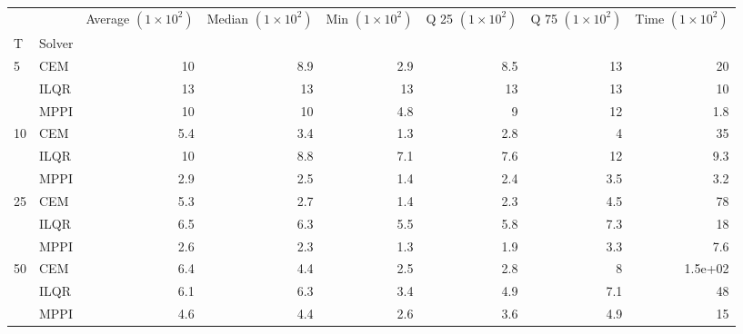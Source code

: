\documentclass[]{standalone}
\begin{document}
\begin{tabular}{llrrrrrr}
\toprule
   &      &  Average $(1 \times 10^2) $ &  Median $(1 \times 10^2) $ &  Min $(1 \times 10^2) $ &  Q 25 $(1 \times 10^2) $ &  Q 75 $(1 \times 10^2) $ &  Time $(1 \times 10^2) $ \\
T & Solver &                             &                            &                         &                          &                          &                          \\
\midrule
5  & CEM &                          10 &                        8.9 &                     2.9 &                      8.5 &                       13 &                       20 \\
   & ILQR &                          13 &                         13 &                      13 &                       13 &                       13 &                       10 \\
   & MPPI &                          10 &                         10 &                     4.8 &                        9 &                       12 &                      1.8 \\
10 & CEM &                         5.4 &                        3.4 &                     1.3 &                      2.8 &                        4 &                       35 \\
   & ILQR &                          10 &                        8.8 &                     7.1 &                      7.6 &                       12 &                      9.3 \\
   & MPPI &                         2.9 &                        2.5 &                     1.4 &                      2.4 &                      3.5 &                      3.2 \\
25 & CEM &                         5.3 &                        2.7 &                     1.4 &                      2.3 &                      4.5 &                       78 \\
   & ILQR &                         6.5 &                        6.3 &                     5.5 &                      5.8 &                      7.3 &                       18 \\
   & MPPI &                         2.6 &                        2.3 &                     1.3 &                      1.9 &                      3.3 &                      7.6 \\
50 & CEM &                         6.4 &                        4.4 &                     2.5 &                      2.8 &                        8 &                  1.5e+02 \\
   & ILQR &                         6.1 &                        6.3 &                     3.4 &                      4.9 &                      7.1 &                       48 \\
   & MPPI &                         4.6 &                        4.4 &                     2.6 &                      3.6 &                      4.9 &                       15 \\
\bottomrule
\end{tabular}
\end{document}
